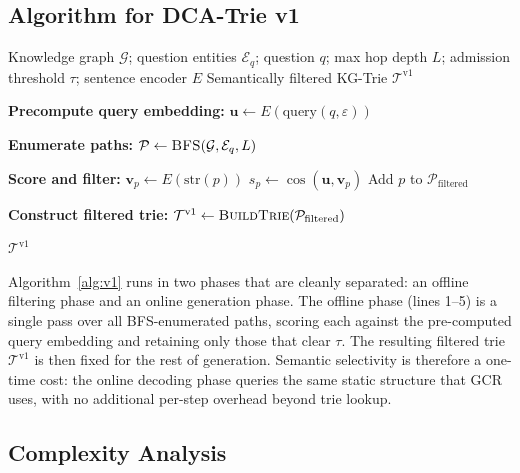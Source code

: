 \subsection{Algorithm for DCA-Trie v1}

\begin{algorithm}[H]
  \caption{DCA-Trie v1: Static Semantic Filtering at Construction Time}
  \label{alg:v1}
  \small
  \begin{algorithmic}[1]
    \Require Knowledge graph $\mathcal{G}$; question entities $\mathcal{E}_q$;
    question $q$; max hop depth $L$; admission threshold $\tau$;
    sentence encoder $E$
    \Ensure Semantically filtered KG-Trie $\mathcal{T}^{\text{v1}}$

    \State \textbf{Precompute query embedding:}
    $\mathbf{u} \gets E(\text{query}(q, \varepsilon))$

    \State \textbf{Enumerate paths:}
    $\mathcal{P} \gets \textsc{BFS}(\mathcal{G}, \mathcal{E}_q, L)$

    \State \textbf{Score and filter:}
    \State $\mathbf{v}_p \gets E(\text{str}(p))$
    \State $s_p \gets \cos(\mathbf{u}, \mathbf{v}_p)$
    \State Add $p$ to $\mathcal{P}_{\text{filtered}}$
    \EndIf
    \EndFor

    \State \textbf{Construct filtered trie:}
    $\mathcal{T}^{\text{v1}} \gets \textsc{BuildTrie}(\mathcal{P}_{\text{filtered}})$

    \State \Return $\mathcal{T}^{\text{v1}}$
  \end{algorithmic}
\end{algorithm}

Algorithm~\ref{alg:v1} runs in two phases that are cleanly separated: an offline filtering phase and an online generation phase. The offline phase (lines 1--5) is a single pass over all BFS-enumerated paths, scoring each against the pre-computed query embedding and retaining only those that clear $\tau$. The resulting filtered trie $\mathcal{T}^{\text{v1}}$ is then fixed for the rest of generation. Semantic selectivity is therefore a one-time cost: the online decoding phase queries the same static structure that GCR uses, with no additional per-step overhead beyond trie lookup.

\subsection{Complexity Analysis}

